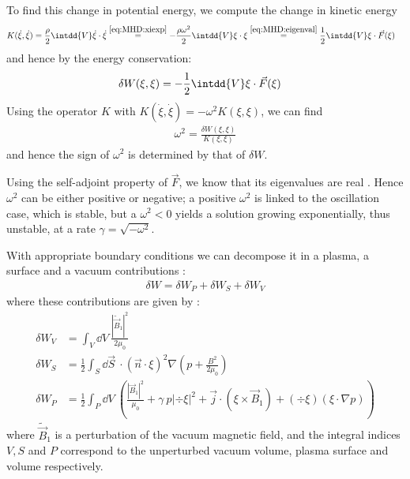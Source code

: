 To find this change in potential energy, we compute the change in kinetic energy
\begin{align*}
	K(\dot{\xi},\dot{\xi}) & = \frac{\rho}{2} \intdd{V} \dot{\xi} \cdot \dot{\xi} \stackrel{\eqref{eq:MHD:xiexp}}{=} - \frac{\rho \omega^2}{2} \intdd{V} \xi \cdot \xi \stackrel{\eqref{eq:MHD:eigenval}}{=} \frac{1}{2} \intdd{V} \xi \cdot \vec{F}(\xi)
\end{align*}
and hence by the energy conservation:
\begin{align*}
	\delta W(\xi,\xi) & = - \frac{1}{2} \intdd{V} \xi \cdot \vec{F}(\xi)
\end{align*}
Using the operator $K$ with $K(\dot{\xi},\dot{\xi}) = -\omega^2 K(\xi,\xi)$, we can find
\begin{align*}
	\omega^2 = \frac{\delta W(\xi,\xi)}{K(\xi,\xi)}
\end{align*}
and hence the sign of $\omega^2$ is determined by that of $\delta W$.

Using the self-adjoint property of $\vec{F}$, we know that its eigenvalues are real \cite{freidberg}. Hence $\omega^2$ can be either positive or negative; a positive $\omega^2$ is linked to the oscillation case, which is stable, but a $\omega^2 < 0$ yields a solution growing exponentially, thus unstable, at a rate $\gamma = \sqrt{-\omega^2}$.

With appropriate boundary conditions we can decompose it in a plasma, a surface and a vacuum contributions \cite{boyd-sanderson}:
\begin{align*}
	\delta W = \delta W_P + \delta W_S + \delta W_V
\end{align*}
where these contributions are given by \cite{boyd-sanderson}:
\begin{align}
	\delta W_V & =             \int_{V} \dd V\ \frac{\left| \widetilde{\vec{B}}_1 \right|^2}{2 \mu_0}\nonumber\\
	\delta W_S & = \frac{1}{2} \int_{S} \dd \vec{S}\ \cdot ( \vec{n} \cdot \xi )^2 \nabla \left( p + \frac{B^2}{2 \mu_0} \right)\nonumber\\
	\delta W_P & = \frac{1}{2} \int_{P} \dd V\ \left( \frac{|\vec{B}_1|^2}{\mu_0} + \gamma\ p |\div \xi|^2 + \vec{j} \cdot ( \xi \times \vec{B}_1 ) + ( \div \xi ) ( \xi \cdot \nabla p ) \right)\label{eq:MHD:deltaWP}
\end{align}
where $\widetilde{\vec{B}}_1$ is a perturbation of the vacuum magnetic field, and the integral indices $V, S$ and $P$ correspond to the unperturbed vacuum volume, plasma surface and volume respectively.

